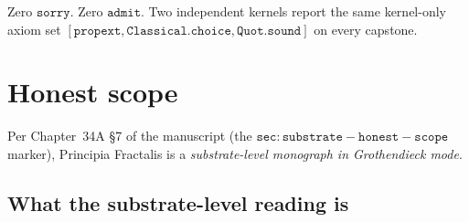 \documentclass[11pt,a4paper]{article}
\theoremstyle{plain}
\theoremstyle{definition}
\begin{document}
Zero $\mathtt{sorry}$. Zero $\mathtt{admit}$. Two independent
kernels report the same kernel-only axiom set
$\mathtt{[propext, Classical.choice, Quot.sound]}$ on every
capstone.

\section{Honest scope}
\label{sec:honest-scope}

Per Chapter~34A \S7 of the manuscript (the
$\mathtt{sec:substrate-honest-scope}$ marker), Principia Fractalis
is a \emph{substrate-level monograph in Grothendieck mode}.

\subsection{What the substrate-level reading is}
\label{sec:substrate-reading}
\end{document}

